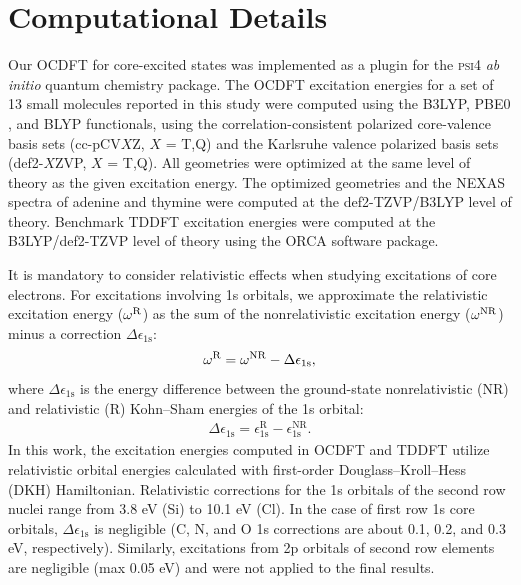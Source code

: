 \documentclass[8.5pt,twoside,twocolumn]{article}
\begin{document}
\section{Computational Details}
Our OCDFT for core-excited states was implemented as a plugin for the \textsc{psi4} \textit{ab initio} quantum chemistry package.\cite{turney_psi4:_2012}
The OCDFT excitation energies for a set of 13 small molecules reported in this study were computed using the B3LYP, \cite{becke_new_1993,lee_development_1988,vosko_accurate_1980,stephens_ab_1994} PBE0 \cite{adamo_toward_1999}, and BLYP\cite{stephens_ab_1994,miehlich_results_1989} functionals, using the correlation-consistent polarized core-valence basis sets (cc-pCV$X$Z, $X$ = T,Q)\cite{woon_gaussian_1995-1}
and the Karlsruhe valence polarized basis sets (def2-$X$ZVP, $X$ = T,Q).\cite{weigend_balanced_2005,weigend_accurate_2006} All geometries were optimized at the same level of theory as the given excitation energy.
The optimized geometries and the NEXAS spectra of adenine and thymine were computed at the def2-TZVP/B3LYP level of theory. 
Benchmark TDDFT excitation energies were computed at the B3LYP/def2-TZVP level of theory using the ORCA software package.\cite{neese_orca_2012}

It is mandatory to consider relativistic effects when studying excitations of core electrons.\cite{maganas_l-edge_2014,debeer_george_calibration_2010,bauer_herfd-xas_2014,ankudinov_sensitivity_2002}
For excitations involving 1s orbitals, we approximate the relativistic excitation energy ($\omega^{\rm R}$) as the sum of the nonrelativistic excitation energy ($ \omega^{\rm NR}$) minus a correction $\Delta\epsilon_{\text{1s}}$:
\begin{align}
\omega^{\rm R} = \omega^{\rm NR} - \Delta\epsilon_{\text{1s}} ,
\end{align}
where $\Delta\epsilon_{\text{1s}}$ is the energy difference between the ground-state nonrelativistic (NR) and relativistic (R) Kohn--Sham energies of the 1s orbital:
\begin{align}
\Delta\epsilon_{\text{1s}} = \epsilon_{\text{1s}}^{\text{R}} - \epsilon_{\text{1s}}^{\text{NR}}.
\end{align}
In this work, the excitation energies computed in OCDFT and TDDFT utilize relativistic orbital energies calculated with first-order Douglass--Kroll--Hess (DKH) Hamiltonian.\cite{douglas_quantum_1973,hess_applicability_1985, hess_relativistic_1986} 
Relativistic corrections for the 1s orbitals of the second row nuclei range from 3.8 eV (Si) to 10.1 eV (Cl). 
In the case of first row 1s core orbitals, $\Delta\epsilon_{\text{1s}}$ is negligible (C, N, and O 1s corrections are about 0.1, 0.2, and 0.3 eV, respectively).  Similarly, excitations from 2p orbitals of second row elements are negligible (max 0.05 eV) and were not applied to the final results.
\end{document}
